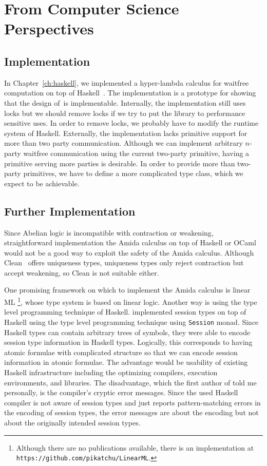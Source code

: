 \section{From Computer Science Perspectives}

\subsection{Implementation}

In Chapter~\ref{ch:haskell}, we implemented a hyper-lambda calculus for
waitfree computation on top of Haskell~\citep{marlow2010haskell}.
The implementation is a prototype for showing that the design of \lgd\,is
implementable.
Internally, the implementation still uses locks but we should remove
locks if we try to put the library to performance sensitive uses.
In order to remove locks, we probably have to modify the runtime system
of Haskell.
Externally, the implementation lacks primitive support for more than two
party communication.  Although we can implement arbitrary $n$-party
waitfree communication using the current two-party primitive, having
a primitive serving more parties is desirable.
In order to provide more than two-party primitives,
we have to define a more complicated type class, which we expect to be
achievable.

\subsection{Further Implementation}

Since Abelian logic is incompatible with contraction or weakening,
straightforward implementation the Amida calculus on top of Haskell or OCaml
would not be a
good way to exploit the safety of the Amida calculus.
Although Clean~\citep{parle1991} offers uniqueness types,
uniqueness types only reject contraction but accept weakening, so Clean
is not suitable either.

One promising framework on which to implement the Amida calculus is linear ML%
\footnote{Although there are no
publications available, there is an implementation at
\texttt{https://github.com/pikatchu/LinearML}\enspace.},
whose type system is based on linear logic.
Another way is using the type level programming technique of Haskell.
\citet{DBLP:journals/corr/abs-1110-4163} implemented session types on top
of Haskell using the type level programming technique using
\texttt{Session} monad.  Since Haskell types can contain arbitrary trees
of symbols, they were able to encode session type information in Haskell
types.
Logically, this corresponds to having atomic formulae with complicated
structure so that we can encode session information in atomic formulae.
The advantage would be usability of existing Haskell infrastructure
including the optimizing compilers, execution environments, and
libraries.
The disadvantage, which the first author of
\citep{DBLP:journals/corr/abs-1110-4163} told me personally,
is the compiler's cryptic error messages.
Since the used Haskell compiler is not aware of session types and just reports
pattern-matching errors in the encoding of session types, the error
messages are about the encoding but not about the originally intended
session types.

